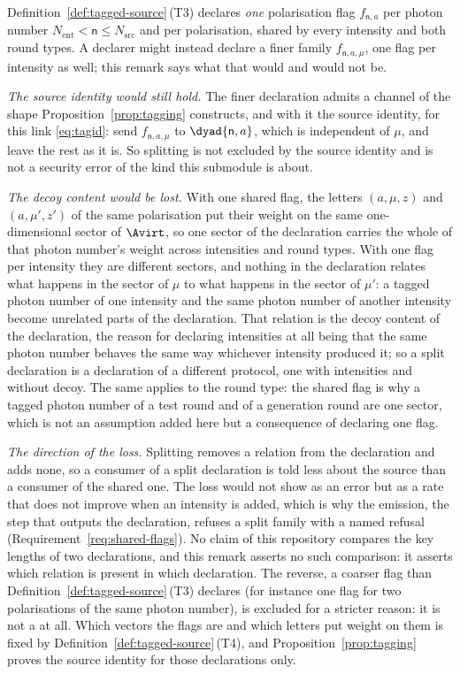 \begin{remark}
\label{rem:no-intensity-split}
Definition~\ref{def:tagged-source}\,(T3) declares \emph{one} polarisation flag
$f_{\mathsf{n},a}$ per photon number $N_{\mathrm{ent}}<\mathsf{n}\le
N_{\mathrm{src}}$ and per polarisation, shared by every intensity and both
round types. A declarer might instead declare a finer family
$f_{\mathsf{n},a,\mu}$, one flag per intensity as well; this remark says what
that would and would not be.

\emph{The source identity would still hold.} The finer declaration admits a
channel of the shape Proposition~\ref{prop:tagging} constructs, and with it the
source identity, for this link \eqref{eq:tagid}: send $f_{\mathsf{n},a,\mu}$ to
$\dyad{\mathsf{n},a}$, which is independent of $\mu$, and leave the rest as it
is. So splitting is not excluded by the source identity and is not a security
error of the kind this submodule is about.

\emph{The decoy content would be lost.} With one shared flag, the letters
$(a,\mu,z)$ and $(a,\mu',z')$ of the same polarisation put their weight on the
same one-dimensional sector of $\Avirt$, so one sector of the declaration
carries the whole of that photon number's weight across intensities and round
types. With one flag per intensity they are different sectors, and nothing in
the declaration relates what happens in the sector of $\mu$ to what happens in
the sector of $\mu'$: a tagged photon number of one intensity and the same
photon number of another intensity become unrelated parts of the declaration.
That relation is the decoy content of the declaration, the reason for declaring
intensities at all being that the same photon number behaves the same way
whichever intensity produced it; so a split declaration is a declaration of a
different protocol, one with intensities and without decoy. The same applies to
the round type: the shared flag is why a tagged photon number of a test round
and of a generation round are one sector, which is not an assumption added here
but a consequence of declaring one flag.

\emph{The direction of the loss.} Splitting removes a relation from the
declaration and adds none, so a consumer of a split declaration is told less
about the source than a consumer of the shared one. The loss would not show as
an error but as a rate that does not improve when an intensity is added, which
is why the emission, the step that outputs the declaration, refuses a split
family with a named refusal (Requirement~\ref{req:shared-flags}). No claim of
this repository compares the key lengths of two declarations, and this remark
asserts no such comparison: it asserts which relation is present in which
declaration. The reverse, a coarser flag than
Definition~\ref{def:tagged-source}\,(T3) declares (for instance one flag for
two polarisations of the same photon number), is excluded for a stricter
reason: it is not a  at all. Which vectors the flags
are and which letters put weight on them is fixed by
Definition~\ref{def:tagged-source}\,(T4), and Proposition~\ref{prop:tagging}
proves the source identity for those declarations only.
\end{remark}

